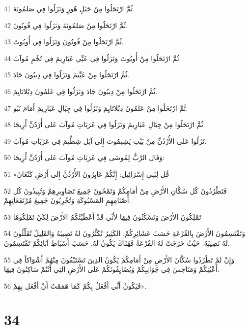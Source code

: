 \par 41 ثُمَّ ارْتَحَلُوا مِنْ جَبَلِ هُورٍ وَنَزَلُوا فِي صَلمُونَةَ.
\par 42 ثُمَّ ارْتَحَلُوا مِنْ صَلمُونَةَ وَنَزَلُوا فِي فُونُونَ.
\par 43 ثُمَّ ارْتَحَلُوا مِنْ فُونُونَ وَنَزَلُوا فِي أُوبُوتَ.
\par 44 ثُمَّ ارْتَحَلُوا مِنْ أُوبُوتَ وَنَزَلُوا فِي عَيِّي عَبَارِيمَ فِي تُخُمِ مُوآبَ.
\par 45 ثُمَّ ارْتَحَلُوا مِنْ عَيِّيمَ وَنَزَلُوا فِي دِيبُونَ جَادَ.
\par 46 ثُمَّ ارْتَحَلُوا مِنْ دِيبُونَ جَادَ وَنَزَلُوا فِي عَلمُونَ دِبْلاتَايِمَ.
\par 47 ثُمَّ ارْتَحَلُوا مِنْ عَلمُونَ دِبْلاتَايِمَ وَنَزَلُوا فِي جِبَالِ عَبَارِيمَ أَمَامَ نَبُو.
\par 48 ثُمَّ ارْتَحَلُوا مِنْ جِبَالِ عَبَارِيمَ وَنَزَلُوا فِي عَرَبَاتِ مُوآبَ عَلى أُرْدُنِّ أَرِيحَا.
\par 49 نَزَلُوا عَلى الأُرْدُنِّ مِنْ بَيْتِ يَشِيمُوتَ إِلى آبَل شِطِّيمَ فِي عَرَبَاتِ مُوآبَ.
\par 50 وَقَال الرَّبُّ لِمُوسَى فِي عَرَبَاتِ مُوآبَ عَلى أُرْدُنِّ أَرِيحَا:
\par 51 «قُل لِبَنِي إِسْرَائِيل: إِنَّكُمْ عَابِرُونَ الأُرْدُنَّ إِلى أَرْضِ كَنْعَانَ
\par 52 فَتَطْرُدُونَ كُل سُكَّانِ الأَرْضِ مِنْ أَمَامِكُمْ وَتَمْحُونَ جَمِيعَ تَصَاوِيرِهِمْ وَتُبِيدُونَ كُل أَصْنَامِهِمِ المَسْبُوكَةِ وَتُخْرِبُونَ جَمِيعَ مُرْتَفَعَاتِهِمْ.
\par 53 تَمْلِكُونَ الأَرْضَ وَتَسْكُنُونَ فِيهَا لأَنِّي قَدْ أَعْطَيْتُكُمُ الأَرْضَ لِكَيْ تَمْلِكُوهَا
\par 54 وَتَقْتَسِمُونَ الأَرْضَ بِالقُرْعَةِ حَسَبَ عَشَائِرِكُمْ. الكَثِيرُ تُكَثِّرُونَ لهُ نَصِيبَهُ وَالقَلِيلُ تُقَلِّلُونَ لهُ نَصِيبَهُ. حَيْثُ خَرَجَتْ لهُ القُرْعَةُ فَهُنَاكَ يَكُونُ لهُ. حَسَبَ أَسْبَاطِ آبَائِكُمْ تَقْتَسِمُونَ.
\par 55 وَإِنْ لمْ تَطْرُدُوا سُكَّانَ الأَرْضِ مِنْ أَمَامِكُمْ يَكُونُ الذِينَ تَسْتَبْقُونَ مِنْهُمْ أَشْوَاكاً فِي أَعْيُنِكُمْ وَمَنَاخِسَ فِي جَوَانِبِكُمْ وَيُضَايِقُونَكُمْ عَلى الأَرْضِ التِي أَنْتُمْ سَاكِنُونَ فِيهَا.
\par 56 فَيَكُونُ أَنِّي أَفْعَلُ بِكُمْ كَمَا هَمَمْتُ أَنْ أَفْعَل بِهِمْ».

\chapter{34}

